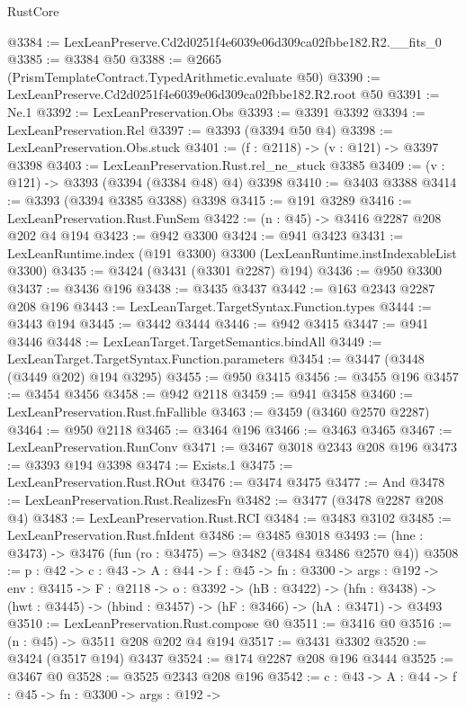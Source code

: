 \begin{lexlean}{RustCore}
\begin{coremodule}
@3384 := LexLeanPreserve.Cd2d0251f4e6039e06d309ca02fbbe182.R2.__fits_0
@3385 := @3384 @50
@3388 := @2665 (PrismTemplateContract.TypedArithmetic.evaluate @50)
@3390 := LexLeanPreserve.Cd2d0251f4e6039e06d309ca02fbbe182.R2.root @50
@3391 := Ne.{1}
@3392 := LexLeanPreservation.Obs
@3393 := @3391 @3392
@3394 := LexLeanPreservation.Rel
@3397 := @3393 (@3394 @50 @4)
@3398 := LexLeanPreservation.Obs.stuck
@3401 := (f : @2118) -> (v : @121) -> @3397 @3398
@3403 := LexLeanPreservation.Rust.rel_ne_stuck @3385
@3409 := (v : @121) -> @3393 (@3394 (@3384 @48) @4) @3398
@3410 := @3403 @3388
@3414 := @3393 (@3394 @3385 @3388) @3398
@3415 := @191 @3289
@3416 := LexLeanPreservation.Rust.FunSem
@3422 := (n : @45) -> @3416 @2287 @208 @202 @4 @194
@3423 := @942 @3300
@3424 := @941 @3423
@3431 := LexLeanRuntime.index (@191 @3300) @3300 (LexLeanRuntime.instIndexableList @3300)
@3435 := @3424 (@3431 (@3301 @2287) @194)
@3436 := @950 @3300
@3437 := @3436 @196
@3438 := @3435 @3437
@3442 := @163 @2343 @2287 @208 @196
@3443 := LexLeanTarget.TargetSyntax.Function.types
@3444 := @3443 @194
@3445 := @3442 @3444
@3446 := @942 @3415
@3447 := @941 @3446
@3448 := LexLeanTarget.TargetSemantics.bindAll
@3449 := LexLeanTarget.TargetSyntax.Function.parameters
@3454 := @3447 (@3448 (@3449 @202) @194 @3295)
@3455 := @950 @3415
@3456 := @3455 @196
@3457 := @3454 @3456
@3458 := @942 @2118
@3459 := @941 @3458
@3460 := LexLeanPreservation.Rust.fnFallible
@3463 := @3459 (@3460 @2570 @2287)
@3464 := @950 @2118
@3465 := @3464 @196
@3466 := @3463 @3465
@3467 := LexLeanPreservation.RunConv
@3471 := @3467 @3018 @2343 @208 @196
@3473 := @3393 @194 @3398
@3474 := Exists.{1}
@3475 := LexLeanPreservation.Rust.ROut
@3476 := @3474 @3475
@3477 := And
@3478 := LexLeanPreservation.Rust.RealizesFn
@3482 := @3477 (@3478 @2287 @208 @4)
@3483 := LexLeanPreservation.Rust.RCI
@3484 := @3483 @3102
@3485 := LexLeanPreservation.Rust.fnIdent
@3486 := @3485 @3018
@3493 := (hne : @3473) -> @3476 (fun (ro : @3475) => @3482 (@3484 @3486 @2570 @4))
@3508 := {p : @42} ->
  {c : @43} ->
  {A : @44} ->
  {f : @45} ->
  {fn : @3300} ->
  {args : @192} ->
  {env : @3415} ->
  {F : @2118} ->
  {o : @3392} ->
  (hB : @3422) ->
  (hfn : @3438) -> (hwt : @3445) -> (hbind : @3457) -> (hF : @3466) -> (hA : @3471) -> @3493
@3510 := LexLeanPreservation.Rust.compose @0
@3511 := @3416 @0
@3516 := (n : @45) -> @3511 @208 @202 @4 @194
@3517 := @3431 @3302
@3520 := @3424 (@3517 @194) @3437
@3524 := @174 @2287 @208 @196 @3444
@3525 := @3467 @0
@3528 := @3525 @2343 @208 @196
@3542 := {c : @43} ->
  {A : @44} ->
  {f : @45} ->
  {fn : @3300} ->
  {args : @192} ->

\end{coremodule}
\end{lexlean}
